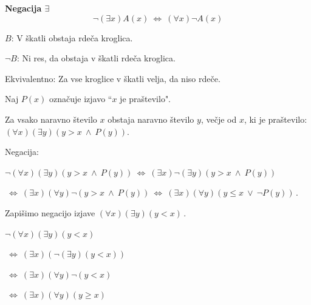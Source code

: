 \documentclass[11pt,paper=b5,DIV=13,headinclude,footinclude]{scrbook}
\newcounter{example}
\def\ali {{~\vee~}}
\def\inn {{~\wedge~}}
\def\sledi {{~\Rightarrow~}}
\def\cee {{~\Leftrightarrow~}}
\begin{document}
\medskip

\noindent\textbf{ Negacija $\exists$}
$$\neg  (\exists x)A(x) \cee (\forall x) \neg A(x)$$

\medskip
\begin{example*}

$B$: V škatli obstaja rdeča kroglica.

$\neg B$: Ni res, da obstaja v škatli rdeča kroglica.

Ekvivalentno: Za vse kroglice v škatli velja, da niso rdeče.\end{example*}


%
%
%
%
%
%
%
%
%
%
%
%
%
\begin{example*}

Naj $P(x)$ označuje izjavo ``$x$ je praštevilo".

Za vsako naravno število $x$ obstaja naravno število $y$, večje od $x$, ki je praštevilo:
  $(\forall x)(\exists y)(y>x\inn P(y))$.

  Negacija:

  $\neg (\forall x)(\exists y)(y>x\inn P(y)) \cee(\exists  x)\neg (\exists y)(y>x\inn P(y))$

  $\cee(\exists  x)(\forall  y)\neg (y>x\inn P(y))\cee(\exists  x)(\forall  y)(y\le x\ali \neg P(y))\,.$\end{example*}

\bigskip
\begin{example*}
Zapišimo negacijo izjave
  $(\forall x)(\exists y)(y<x)\,.$

  $\neg(\forall x)(\exists y)(y<x)$

  $\cee (\exists x)(\neg(\exists y)(y<x))$

  $\cee (\exists x)(\forall y)\neg(y<x)$

  $\cee (\exists x)(\forall y)(y\ge x)$
  \end{example*}
\end{document}
